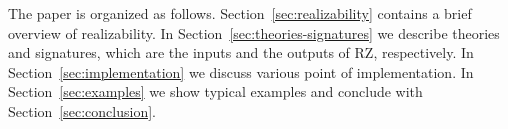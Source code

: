 The paper is organized as follows. Section~\ref{sec:realizability}
contains a brief overview of realizability. In
Section~\ref{sec:theories-signatures} we describe theories and
signatures, which are the inputs and the outputs of RZ, respectively. In
Section~\ref{sec:implementation} we discuss various point of
implementation. In Section~\ref{sec:examples} we show typical examples
and conclude with Section~\ref{sec:conclusion}.



